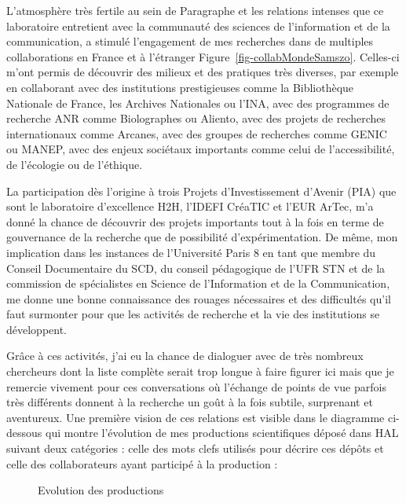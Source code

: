 \documentclass[
  a4paper,
  DIV=11,
  numbers=noendperiod]{scrreprt}
\begin{document}
L'atmosphère très fertile au sein de Paragraphe et les relations
intenses que ce laboratoire entretient avec la communauté des sciences
de l'information et de la communication, a stimulé l'engagement de mes
recherches dans de multiples collaborations en France et à l'étranger
Figure~\ref{fig-collabMondeSamszo}. Celles-ci m'ont permis de découvrir
des milieux et des pratiques très diverses, par exemple en collaborant
avec des institutions prestigieuses comme la Bibliothèque Nationale de
France, les Archives Nationales ou l'INA, avec des programmes de
recherche ANR comme Biolographes ou Aliento, avec des projets de
recherches internationaux comme Arcanes, avec des groupes de recherches
comme GENIC ou MANEP, avec des enjeux sociétaux importants comme celui
de l'accessibilité, de l'écologie ou de l'éthique.

La participation dès l'origine à trois Projets d'Investissement d'Avenir
(PIA) que sont le laboratoire d'excellence H2H, l'IDEFI CréaTIC et l'EUR
ArTec, m'a donné la chance de découvrir des projets importants tout à la
fois en terme de gouvernance de la recherche que de possibilité
d'expérimentation. De même, mon implication dans les instances de
l'Université Paris 8 en tant que membre du Conseil Documentaire du SCD,
du conseil pédagogique de l'UFR STN et de la commission de spécialistes
en Science de l'Information et de la Communication, me donne une bonne
connaissance des rouages nécessaires et des difficultés qu'il faut
surmonter pour que les activités de recherche et la vie des institutions
se développent.

Grâce à ces activités, j'ai eu la chance de dialoguer avec de très
nombreux chercheurs dont la liste complète serait trop longue à faire
figurer ici mais que je remercie vivement pour ces conversations où
l'échange de points de vue parfois très différents donnent à la
recherche un goût à la fois subtile, surprenant et aventureux. Une
première vision de ces relations est visible dans le diagramme
ci-dessous qui montre l'évolution de mes productions scientifiques
déposé dans HAL suivant deux catégories : celle des mots clefs utilisés
pour décrire ces dépôts et celle des collaborateurs ayant participé à la
production :

\begin{figure}


\caption{\label{fig-steamHalSamszo}Evolution des productions}

\end{figure}%
\end{document}
